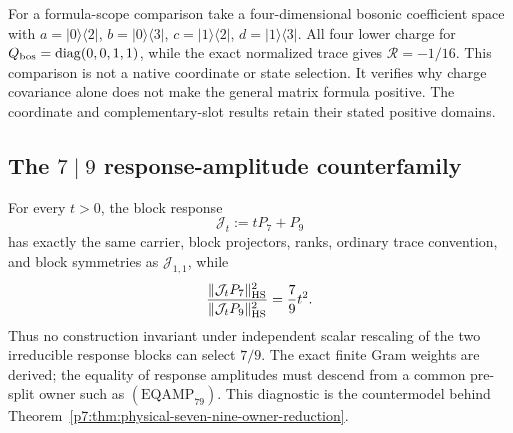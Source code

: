 \documentclass[11pt,a4paper]{article}
\begin{document}
For a formula-scope comparison take a four-dimensional bosonic coefficient
space with $a=|0\rangle\langle2|$, $b=|0\rangle\langle3|$,
$c=|1\rangle\langle2|$, $d=|1\rangle\langle3|$.
All four lower charge for $Q_{\rm bos}=\operatorname{diag}(0,0,1,1)$, while the
exact normalized trace gives $\mathcal R=-1/16$.
This comparison is not a native coordinate or state selection. It verifies
why charge covariance alone does not make the general matrix formula
positive. The coordinate and complementary-slot results retain their stated
positive domains.




\subsection{The \(7\mid9\) response-amplitude counterfamily}
\label{p7:app:seven-nine-counterfamily}
For every \(t>0\), the block response
\[
 \mathcal J_t:=tP_7+P_9
\]
has exactly the same carrier, block projectors, ranks, ordinary trace
convention, and block symmetries as \(\mathcal J_{1,1}\), while
\[
 \frac{\|\mathcal J_tP_7\|_{\rm HS}^2}
      {\|\mathcal J_tP_9\|_{\rm HS}^2}
 =\frac79t^2.
\]
Thus no construction invariant under independent scalar rescaling of the two
irreducible response blocks can select \(7/9\).  The exact finite Gram weights
are derived; the equality of response amplitudes must descend from a common
pre-split owner such as \((\mathrm{EQAMP}_{79})\).  This diagnostic is the
countermodel behind
Theorem~\ref{p7:thm:physical-seven-nine-owner-reduction}.
\end{document}

